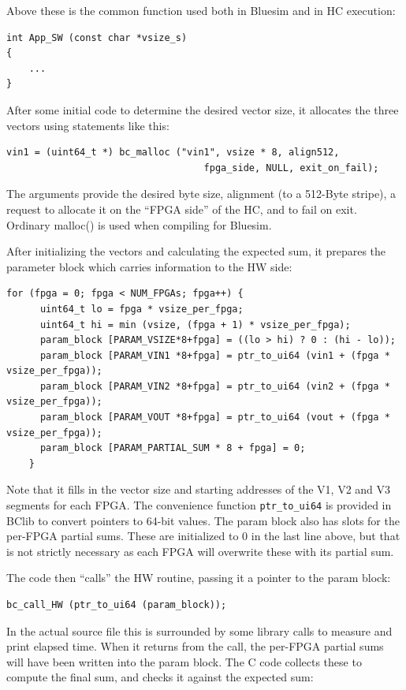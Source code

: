 \documentclass[twoside,letterpaper,11pt]{article}
\begin{document}
Above these is the common function used both in Bluesim and in HC execution:
\begin{Verbatim}[frame=single, label=App\_SW.c]   
int App_SW (const char *vsize_s)
{
    ...
}
\end{Verbatim}
After some initial code to determine the desired vector size, it
allocates the three vectors using statements like this:
\begin{Verbatim}[frame=single, label=App\_SW.c] 
    vin1 = (uint64_t *) bc_malloc ("vin1", vsize * 8, align512,
                                   fpga_side, NULL, exit_on_fail);
\end{Verbatim} 
The arguments provide the desired byte size, alignment (to a 512-Byte
stripe), a request to allocate it on the ``FPGA side'' of the HC, and
to fail on exit.  Ordinary malloc() is used when compiling for
Bluesim.

After initializing the vectors and calculating the expected sum, it
prepares the parameter block which carries information to the HW side:
\begin{Verbatim}[frame=single, label=App\_SW.c]  
    for (fpga = 0; fpga < NUM_FPGAs; fpga++) {
      uint64_t lo = fpga * vsize_per_fpga;
      uint64_t hi = min (vsize, (fpga + 1) * vsize_per_fpga);
      param_block [PARAM_VSIZE*8+fpga] = ((lo > hi) ? 0 : (hi - lo));
      param_block [PARAM_VIN1 *8+fpga] = ptr_to_ui64 (vin1 + (fpga * vsize_per_fpga));
      param_block [PARAM_VIN2 *8+fpga] = ptr_to_ui64 (vin2 + (fpga * vsize_per_fpga));
      param_block [PARAM_VOUT *8+fpga] = ptr_to_ui64 (vout + (fpga * vsize_per_fpga));
      param_block [PARAM_PARTIAL_SUM * 8 + fpga] = 0;
    }
\end{Verbatim} 
Note that it fills in the vector size and starting addresses of the
V1, V2 and V3 segments for each FPGA.  The convenience function
\verb|ptr_to_ui64| is provided in BClib to convert pointers to 64-bit
values.  The param block also has slots for the per-FPGA partial sums.
These are initialized to 0 in the last line above, but that is not
strictly necessary as each FPGA will overwrite these with its partial
sum.


The code then ``calls'' the HW routine, passing it a pointer to the
param block:

\begin{Verbatim}[frame=single, label=App\_SW.c]  
    bc_call_HW (ptr_to_ui64 (param_block));
\end{Verbatim} 

In the actual source file this is surrounded by some library calls to
measure and print elapsed time.  When it returns from the call, the
per-FPGA partial sums will have been written into the param block.
The C code collects these to compute the final sum, and checks it
against the expected sum:
\end{document}
